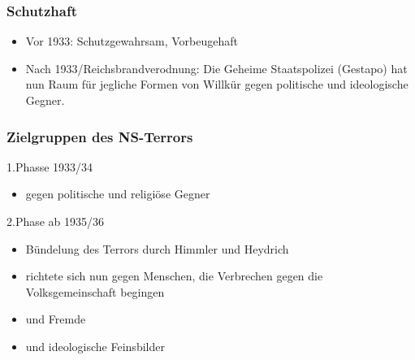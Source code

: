 \documentclass{article}
\begin{document}
\subsubsection*{Schutzhaft}
\begin{itemize}
    \item Vor 1933: Schutzgewahrsam, Vorbeugehaft
    \item Nach 1933/Reichsbrandverodnung: Die Geheime Staatspolizei (Gestapo) hat nun
    Raum für jegliche Formen von Willkür gegen politische und ideologische Gegner.
\end{itemize}
\subsubsection*{Zielgruppen des NS-Terrors}
1.Phasse 1933/34
\begin{itemize}
    \item gegen politische und religiöse Gegner
\end{itemize}
2.Phase ab 1935/36
\begin{itemize}
    \item Bündelung des Terrors durch Himmler und Heydrich
    \item richtete sich nun gegen Menschen, die Verbrechen gegen die Volksgemeinschaft begingen
    \item und Fremde
    \item und ideologische Feinsbilder
\end{itemize}
\end{document}
